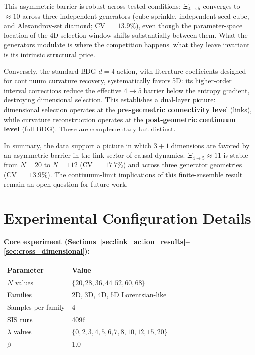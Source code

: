 \documentclass[12pt,a4paper]{article}
\begin{document}
This asymmetric barrier is robust across tested conditions: $\Xi_{4 \to 5}$ converges to $\approx 10$ across
three independent generators (cube sprinkle, independent-seed cube, and Alexandrov-set diamond;
CV~$= 13.9\%$), even though the parameter-space location of the 4D selection window shifts
substantially between them. What the generators modulate is where the competition happens;
what they leave invariant is its intrinsic structural price.

Conversely, the standard BDG $d{=}4$ action, with literature coefficients designed for
continuum curvature recovery, systematically favors 5D: its higher-order interval corrections
reduce the effective $4{\to}5$ barrier below the entropy gradient, destroying dimensional selection.
This establishes a dual-layer picture: dimensional selection operates at the
\textbf{pre-geometric connectivity level} (links), while curvature reconstruction operates at the
\textbf{post-geometric continuum level} (full BDG). These are complementary but distinct.

In summary, the data support a picture in which
$3{+}1$ dimensions are favored by an asymmetric barrier in the link sector of
causal dynamics. $\Xi_{4 \to 5} \approx 11$ is stable from $N = 20$ to $N = 112$
(CV~$= 17.7\%$) and across three generator geometries (CV~$= 13.9\%$).
The continuum-limit implications of this finite-ensemble result remain
an open question for future work.


\appendix

\section{Experimental Configuration Details}
\label{app:config}

\textbf{Core experiment (Sections~\ref{sec:link_action_results}--\ref{sec:cross_dimensional}):}
\begin{center}
\begin{tabular}{@{}ll@{}}
\toprule
Parameter & Value \\
\midrule
$N$ values & $\{20, 28, 36, 44, 52, 60, 68\}$ \\
Families & 2D, 3D, 4D, 5D Lorentzian-like \\
Samples per family & 4 \\
SIS runs & 4096 \\
$\lambda$ values & $\{0, 2, 3, 4, 5, 6, 7, 8, 10, 12, 15, 20\}$ \\
$\beta$ & 1.0 \\
\bottomrule
\end{tabular}
\end{center}
\end{document}

